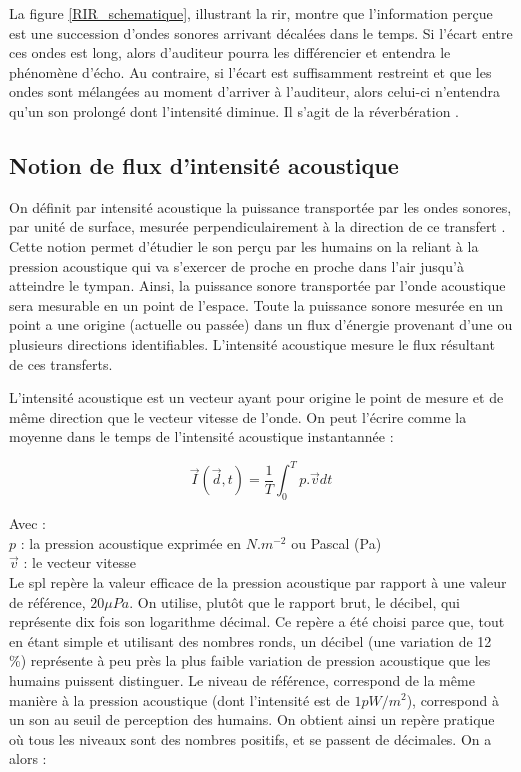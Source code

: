 La figure \ref{RIR_schematique}, illustrant la \gls{rir}, montre que l'information perçue est une succession d'ondes sonores arrivant décalées dans le temps. Si l'écart entre ces ondes est long, alors d'auditeur pourra les différencier et entendra le phénomène d'écho. Au contraire, si l'écart est suffisamment restreint et que les ondes sont mélangées au moment d'arriver à l'auditeur, alors celui-ci n'entendra qu'un son prolongé dont l'intensité diminue. Il s'agit de la réverbération \cite[p. 39]{sabine}. 





\subsection{Notion de flux d'intensité acoustique} \label{sect_intensite}
On définit par intensité acoustique la puissance transportée par les ondes sonores, par unité de surface, mesurée perpendiculairement à la direction de ce transfert \cite[IEC 60050]{cei}. Cette notion permet d'étudier le son perçu par les humains on la reliant à la pression acoustique qui va s'exercer de proche en proche dans l'air jusqu'à atteindre le tympan. Ainsi, la puissance sonore transportée par l'onde acoustique sera mesurable en un point de l'espace. Toute la puissance sonore mesurée en un point a une origine (actuelle ou passée) dans un flux d'énergie provenant d'une ou plusieurs directions identifiables. L'intensité acoustique mesure le flux résultant de ces transferts. 

L'intensité acoustique est un vecteur ayant pour origine le point de mesure et de même direction que le vecteur vitesse de l'onde. On peut l'écrire comme la moyenne dans le temps de l'intensité acoustique instantannée :

\begin{equation} 
\overrightarrow{I}(\overrightarrow{d},t) = \frac{1}{T} \int^T_0 p.\overrightarrow{v}dt
\end{equation}

Avec : \\
$p$ : la pression acoustique exprimée en $N.m^{-2}$ ou Pascal (Pa) \\
$\overrightarrow{v}$  : le vecteur vitesse \\

Le \gls{spl} repère la valeur efficace de la pression acoustique par rapport à une valeur de référence, $20 \mu Pa$. On utilise, plutôt que le rapport brut, le décibel, qui représente dix fois son logarithme décimal. Ce repère a été choisi parce que, tout en étant simple et utilisant des nombres ronds, un décibel (une variation de 12 \%) représente à peu près la plus faible variation de pression acoustique que les humains puissent distinguer. Le niveau de référence, correspond de la même manière à la pression acoustique (dont l'intensité est de $1 pW/m^2$), correspond à un son au seuil de perception des humains. On obtient ainsi un repère pratique où tous les niveaux sont des nombres positifs, et se passent de décimales. On a alors :

